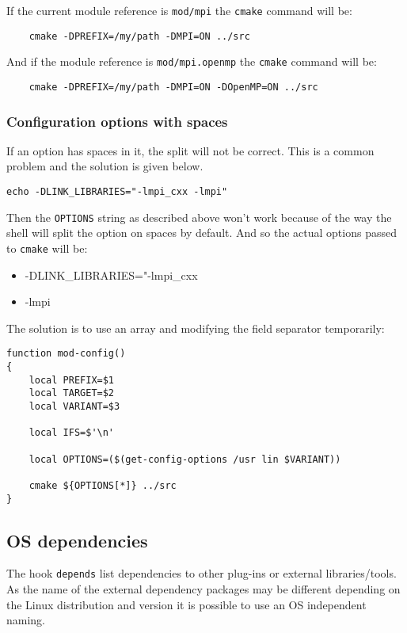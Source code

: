 \documentclass[a4paper,12pt,twoside]{article}
\newcommand{\code}[1]{\texttt{#1}}
\begin{document}
If the current module reference is \code{mod/mpi} the \code{cmake} command will be:

\begin{lstlisting}
	cmake -DPREFIX=/my/path -DMPI=ON ../src
\end{lstlisting}

And if the module reference is \code{mod/mpi.openmp} the \code{cmake} command will be:

\begin{lstlisting}
	cmake -DPREFIX=/my/path -DMPI=ON -DOpenMP=ON ../src
\end{lstlisting}

\subsubsection{Configuration options with spaces}
\label{config options spaces}

If an option has spaces in it, the split will not be correct. This is a common problem and the solution is given below.

\code{echo -DLINK\_LIBRARIES="-lmpi\_cxx -lmpi"}

Then the \code{OPTIONS} string as described above won't work because of the way the shell will split the option on spaces by default. And so the actual options passed to \code{cmake} will be:

\begin{itemize}
	\item -DLINK\_LIBRARIES="-lmpi\_cxx
	\item -lmpi
\end{itemize}

The solution is to use an array and modifying the field separator temporarily:

\begin{lstlisting}
function mod-config()
{
	local PREFIX=$1
	local TARGET=$2
	local VARIANT=$3

	local IFS=$'\n'

	local OPTIONS=($(get-config-options /usr lin $VARIANT))

	cmake ${OPTIONS[*]} ../src
}
\end{lstlisting}

\subsection{OS dependencies}
\label{OS dependencies}

The hook \code{depends} list dependencies to other plug-ins or external libraries/tools. As the name of the external dependency packages may be different depending on the Linux distribution and version it is possible to use an OS independent naming.
\end{document}
